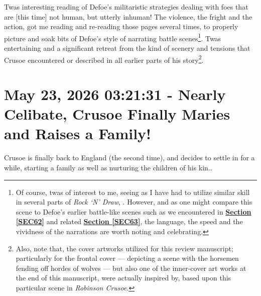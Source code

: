 \documentclass[a4paper]{article}
\begin{document}
Twas interesting reading of Defoe's militaristic strategies dealing with foes that are [this time] not human, but utterly inhuman! The violence, the fright and the action, got me reading and re-reading those pages several times, to properly picture and soak bits of Defoe's style of narrating battle scenes\footnote{Of course, twas of interest to me, seeing as I have had to utilize similar skill in several parts of \textit{Rock `N' Draw}, \cite{lutalo2025rock}. However, and as one might compare this scene to Defoe's earlier battle-like scenes such as we encountered in \textbf{\hyperref[SEC62]{Section \ref{SEC62}}} and related \textbf{\hyperref[SEC63]{Section \ref{SEC63}}}, the language, the speed and the  vividness of the narrations are worth noting and celebrating.}. Twas entertaining and a significant retreat from the kind of scenery and tensions that Crusoe encountered or described in all earlier parts of his story\footnote{Also, note that, the cover artworks utilized for this review manuscript; particularly for the frontal cover --- depicting a scene with the horsemen fending off hordes of wolves --- but also one of the inner-cover art works at the end of this manuscript, were actually inspired by, based upon this particular scene in \textit{Robinson Crusoe}.}.





\section{May 23, 2026 03:21:31 - Nearly Celibate, Crusoe Finally Maries and Raises a Family!}
\label{SEC75}


Crusoe is finally back to England (the second time), and decides to settle in for a while, starting a family as well as nurturing the children of his kin..
\end{document}
